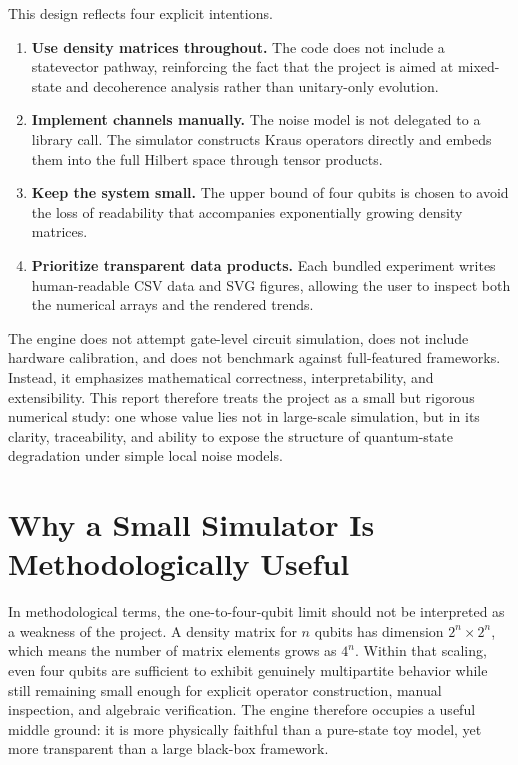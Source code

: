 This design reflects four explicit intentions.
\begin{enumerate}
\item \textbf{Use density matrices throughout.} The code does not include a statevector pathway, reinforcing the fact that the project is aimed at mixed-state and decoherence analysis rather than unitary-only evolution.
\item \textbf{Implement channels manually.} The noise model is not delegated to a library call. The simulator constructs Kraus operators directly and embeds them into the full Hilbert space through tensor products.
\item \textbf{Keep the system small.} The upper bound of four qubits is chosen to avoid the loss of readability that accompanies exponentially growing density matrices.
\item \textbf{Prioritize transparent data products.} Each bundled experiment writes human-readable CSV data and SVG figures, allowing the user to inspect both the numerical arrays and the rendered trends.
\end{enumerate}

The engine does not attempt gate-level circuit simulation, does not include hardware calibration, and does not benchmark against full-featured frameworks. Instead, it emphasizes mathematical correctness, interpretability, and extensibility. This report therefore treats the project as a small but rigorous numerical study: one whose value lies not in large-scale simulation, but in its clarity, traceability, and ability to expose the structure of quantum-state degradation under simple local noise models.

\section{Why a Small Simulator Is Methodologically Useful}

In methodological terms, the one-to-four-qubit limit should not be interpreted as a weakness of the project. A density matrix for $n$ qubits has dimension $2^n \times 2^n$, which means the number of matrix elements grows as $4^n$. Within that scaling, even four qubits are sufficient to exhibit genuinely multipartite behavior while still remaining small enough for explicit operator construction, manual inspection, and algebraic verification. The engine therefore occupies a useful middle ground: it is more physically faithful than a pure-state toy model, yet more transparent than a large black-box framework.

